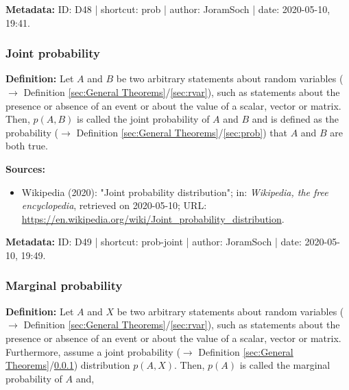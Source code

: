 \documentclass[a4paper,12pt,twoside]{book}
\begin{document}
\vspace{1em}
\textbf{Metadata:} ID: D48 | shortcut: prob | author: JoramSoch | date: 2020-05-10, 19:41.
\vspace{1em}



\subsubsection[\textit{Joint probability}]{Joint probability} \label{sec:prob-joint}
\setcounter{equation}{0}

\textbf{Definition:} Let $A$ and $B$ be two arbitrary statements about random variables ($\rightarrow$ Definition \ref{sec:General Theorems}/\ref{sec:rvar}), such as statements about the presence or absence of an event or about the value of a scalar, vector or matrix. Then, $p(A,B)$ is called the joint probability of $A$ and $B$ and is defined as the probability ($\rightarrow$ Definition \ref{sec:General Theorems}/\ref{sec:prob}) that $A$ and $B$ are both true.


\vspace{1em}
\textbf{Sources:}
\begin{itemize}
\item Wikipedia (2020): "Joint probability distribution"; in: \textit{Wikipedia, the free encyclopedia}, retrieved on 2020-05-10; URL: \url{https://en.wikipedia.org/wiki/Joint_probability_distribution}.
\end{itemize}


\vspace{1em}
\textbf{Metadata:} ID: D49 | shortcut: prob-joint | author: JoramSoch | date: 2020-05-10, 19:49.
\vspace{1em}



\subsubsection[\textit{Marginal probability}]{Marginal probability} \label{sec:prob-marg}
\setcounter{equation}{0}

\textbf{Definition:} Let $A$ and $X$ be two arbitrary statements about random variables ($\rightarrow$ Definition \ref{sec:General Theorems}/\ref{sec:rvar}), such as statements about the presence or absence of an event or about the value of a scalar, vector or matrix. Furthermore, assume a joint probability ($\rightarrow$ Definition \ref{sec:General Theorems}/\ref{sec:prob-joint}) distribution $p(A,X)$. Then, $p(A)$ is called the marginal probability of $A$ and,
\end{document}
